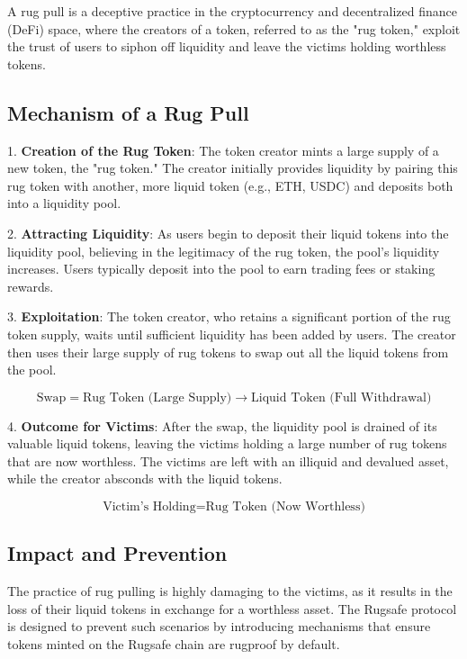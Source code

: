 \documentclass{article}
\begin{document}
A rug pull is a deceptive practice in the cryptocurrency and decentralized finance (DeFi) space, where the creators of a token, referred to as the "rug token," exploit the trust of users to siphon off liquidity and leave the victims holding worthless tokens.

\subsection{Mechanism of a Rug Pull}

1. \textbf{Creation of the Rug Token}: The token creator mints a large supply of a new token, the "rug token." The creator initially provides liquidity by pairing this rug token with another, more liquid token (e.g., ETH, USDC) and deposits both into a liquidity pool.

2. \textbf{Attracting Liquidity}: As users begin to deposit their liquid tokens into the liquidity pool, believing in the legitimacy of the rug token, the pool's liquidity increases. Users typically deposit into the pool to earn trading fees or staking rewards.

3. \textbf{Exploitation}: The token creator, who retains a significant portion of the rug token supply, waits until sufficient liquidity has been added by users. The creator then uses their large supply of rug tokens to swap out all the liquid tokens from the pool.

\[
\text{Swap} = \text{Rug Token (Large Supply)} \rightarrow \text{Liquid Token (Full Withdrawal)}
\]

4. \textbf{Outcome for Victims}: After the swap, the liquidity pool is drained of its valuable liquid tokens, leaving the victims holding a large number of rug tokens that are now worthless. The victims are left with an illiquid and devalued asset, while the creator absconds with the liquid tokens.

\[
\text{Victim's Holding} = \text{Rug Token (Now Worthless)}
\]

\subsection{Impact and Prevention}

The practice of rug pulling is highly damaging to the victims, as it results in the loss of their liquid tokens in exchange for a worthless asset. The Rugsafe protocol is designed to prevent such scenarios by introducing mechanisms that ensure tokens minted on the Rugsafe chain are rugproof by default.
\end{document}
